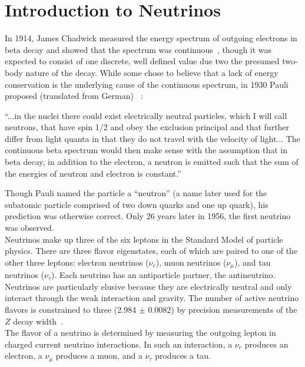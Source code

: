 \section{Introduction to Neutrinos}
In 1914, James Chadwick measured the energy spectrum of outgoing electrons in beta decay and showed that the spectrum was continuous~\cite{ChadwickSource}, though it was expected to consist of one discrete, well defined value due two the presumed two-body nature of the decay. While some chose to believe that a lack of energy conservation is the underlying cause of the continuous spectrum, in 1930 Pauli proposed (translated from German) ~\cite{PauliLetter}:
\begin{displayquote}
``...in the nuclei there could exist electrically neutral particles, which I will call neutrons, that have spin 1/2 and obey the exclusion principal and that further differ from light quanta in that they do not travel with the velocity of light... The continuous beta spectrum would then make sense with the assumption that in beta decay, in addition to the electron, a neutron is emitted such that the sum of the energies of neutron and electron is constant.''
\end{displayquote}
Though Pauli named the particle a ``neutron'' (a name later used for the subatomic particle comprised of two down quarks and one up quark), his prediction was otherwise correct. Only 26 years later in 1956, the first neutrino was observed.\\

Neutrinos make up three of the six leptons in the Standard Model of particle physics. There are three flavor eigenstates, each of which are paired to one of the other three leptons: electron neutrinos ($\nu_e$), muon neutrinos ($\nu_\mu$), and tau neutrinos ($\nu_\tau$). Each neutrino has an antiparticle partner, the antineutrino. Neutrinos are particularly elusive because they are electrically neutral and only interact through the weak interaction and gravity. The number of active neutrino flavors is constrained to three (2.984 $\pm$ 0.0082) by precision measurements of the $Z$ decay width~\cite{ZDecayWidthsource}. \\

The flavor of a neutrino is determined by measuring the outgoing lepton in charged current neutrino interactions. In such an interaction, a $\nu_e$ produces an electron, a $\nu_\mu$ produces a muon, and a $\nu_\tau$ produces a tau.\\

